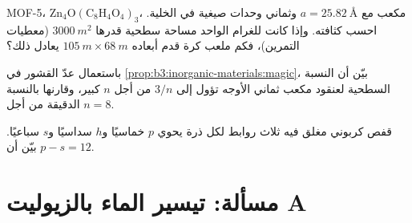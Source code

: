 \begin{exercise}[$\star\star\star$]\label{exo:b3:inorganic-materials:10}
MOF-5، $\mathrm{Zn_4O(C_8H_4O_4)_3}$، مكعب مع $a = \qty{25.82}{\angstrom}$ وثماني وحدات صيغية في الخلية.
احسب كثافته. وإذا كانت للغرام الواحد مساحة سطحية قدرها $\qty{3000}{m^2}$ (معطيات
التمرين)، فكم ملعب كرة قدم أبعاده $\qty{105}{m} \times \qty{68}{m}$ يعادل ذلك؟
\end{exercise}

\begin{exercise}[$\star\star\star$]\label{exo:b3:inorganic-materials:11}
باستعمال عدّ القشور في \cref{prop:b3:inorganic-materials:magic}، بيّن أن
النسبة السطحية لعنقود مكعب ثماني الأوجه تؤول إلى $3/n$ من أجل $n$ كبير، 
وقارنها بالنسبة الدقيقة من أجل $n = 8$.
\end{exercise}

\begin{exercise}[$\star\star\star$]\label{exo:b3:inorganic-materials:12}
قفص كربوني مغلق فيه ثلاث روابط لكل ذرة يحوي $p$ خماسيًا و$h$ سداسيًا
و$s$ سباعيًا. بيّن أن $p - s = 12$.
\end{exercise}

\section{مسألة: تيسير الماء بالزيوليت A}

